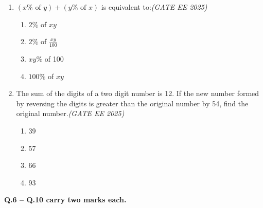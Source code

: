 \begin{enumerate}[leftmargin=0pt,label=\textbf{Q.\arabic*}]
\vspace{1em}

\item $(x \% \text{ of } y) + (y \% \text{ of } x)$ is equivalent to:\hfill \textit{(GATE EE 2025)}

\begin{multicols}{2}
\begin{enumerate}[label=(\Alph*)]
\item $2 \%$ of $xy$
\item $2 \%$ of $\frac{xy}{100}$
\item $xy \%$ of 100
\item $100 \%$ of $xy$
\end{enumerate}
\end{multicols}

\vspace{1em}

\item The sum of the digits of a two digit number is 12. If the new number formed by reversing the digits is greater than the original number by 54, find the original number.\hfill \textit{(GATE EE 2025)}

\begin{multicols}{2}
\begin{enumerate}[label=(\Alph*)]
\item 39
\item 57
\item 66
\item 93
\end{enumerate}

\end{multicols}

\end{enumerate}


\noindent \textbf{Q.6 -- Q.10 carry two marks each.}

